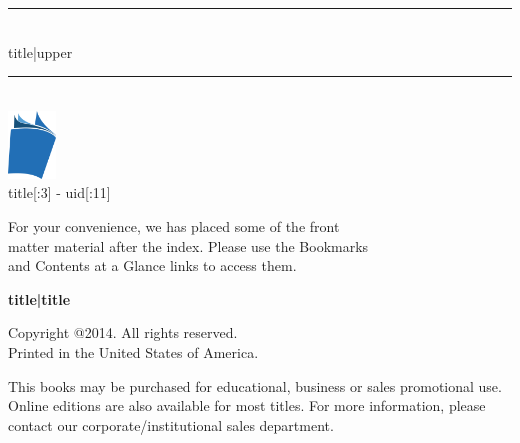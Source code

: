 \documentclass{article}
\newcommand{\HRule}{\rule{\linewidth}{1mm}}
\begin{document}
\begin{titlepage}

\pagecolor{titlepagecolor}
\color{white}

\begin{flushright}
\textcolor{white}{ }

\vspace{7cm}

\HRule \\[0.4cm]
{\large {{ title|upper }} }\\[0.4cm]
\HRule \\[2.5cm]

\includegraphics[height=18mm]{book-icon.png} \\[2mm]
\scriptsize{ {{ title[:3] }}-{{ uid[:11] }} }

\end{flushright}

\vfill

\begin{flushright}
\footnotesize{ For your convenience, we has placed some of the front \\
matter material after the index. Please use the Bookmarks \\
and Contents at a Glance links to access them. }
\end{flushright}

\end{titlepage}

\nopagecolor %

\noindent
{\textbf {\footnotesize {{ title|title }} }}

\vspace{6pt}

\noindent
\scriptsize{Copyright @2014. All rights reserved. \\Printed in the United
  States of America.}

\noindent
\scriptsize{This books may be purchased for educational, business or
  sales promotional use. Online editions are also available for most
  titles. For more information, please contact our
  corporate/institutional sales department.}
\end{document}
